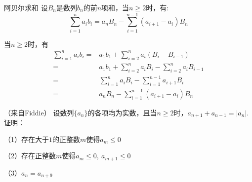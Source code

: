 \begin{theorem}{阿贝尔求和}{}
    设$B_n$是数列$b_n$的前$n$项和，当$n\ge 2$时，有:\vspace{-5pt}\[
    \sum_{i=1}^na_ib_i=a_nB_n-\sum_{i=1}^{n-1}(a_{i+1}-a_i)B_n\]
\end{theorem}
\begin{myproof}
    当$n\ge 2$时，有
    \begin{align*}
        \sum_{i=1}^na_ib_i=&a_1b_1+\sum_{i=2}^{n}a_i(B_i-B_{i-1})\\
        =&a_1b_1+\sum_{i=2}^{n}a_iB_i-\sum_{i=2}^{n}a_iB_{i-1}\\
        =&\sum_{i=1}^{n}a_iB_i-\sum_{i=1}^{n-1}a_{i+1}B_i\\
        =&a_nB_n-\sum_{i=1}^{n-1}(a_{i+1}-a_i)B_n
    \end{align*}
\end{myproof}
\begin{example}{（来自Fiddie）}{}
    设数列$\{a_n\}$的各项均为实数，且当$n\ge 2$时，$a_{n+1}+a_{n-1}=|a_n|$.证明：

    （1）存在大于$1$的正整数$m$使得$a_m\le 0$

    （2）存在正整数$m$使得$a_m\le 0,~a_{m+1}\le 0$

    （3）$a_n=a_{n+9}$ 
\end{example}
